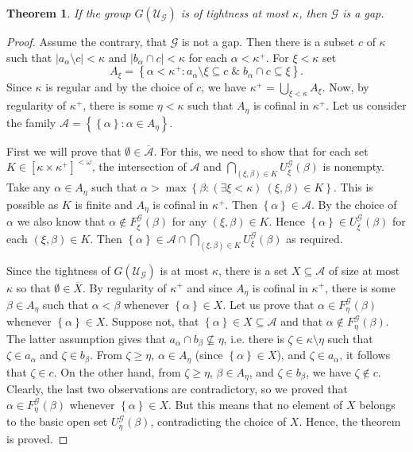 \documentclass{amsart}
\theoremstyle{plain}
\newtheorem{theorem}{Theorem}[section]
\theoremstyle{definition}
\numberwithin{equation}{section}
\renewcommand{\a}{\alpha}
\renewcommand{\b}{\beta}
\renewcommand{\k}{\kappa}
\renewcommand{\o}{\omega}
\newcommand{\ps}{\emptyset}
\newcommand{\sst}{\subseteq}
\newcommand{\cu}{\mathcal U}
\newcommand{\set}[1]{\left\{#1\right\}}
\newcommand{\abs}[1]{\left\vert#1\right\vert}
\begin{document}
\begin{theorem}\label{t:gap-frechet}
	If the group $G(\cu_\mathcal{G})$ is of tightness at most $\k$, then $\mathcal{G}$ is a gap.
\end{theorem}

\begin{proof}
	Assume the contrary, that $\mathcal{G}$ is not a gap.
	Then there is a subset $c$ of $\k$ such that $\abs{a_{\a}\setminus c}<\k$ and $\abs{b_{\a} \cap c}<\k$ for each $\a < \k^+$.
	For $\xi<\k$ set
	$$
	A_{\xi} = \set{\a < \k^+: a_{\a}\setminus \xi \sst c \;\&\; b_{\a} \cap c \sst \xi}.
	$$
	Since $\k$ is regular and by the choice of $c$, we have $\k^+ = \bigcup_{\xi < \k}A_{\xi}$.
	Now, by regularity of $\k^+$, there is some $\eta < \k$ such that $A_{\eta}$ is cofinal in $\k^+$.
	Let us consider the family $\mathcal{A} = \set{ \set{\a}: \a \in A_{\eta} }$.
	
	First we will prove that $\ps \in \overline{\mathcal{A}}$.
	For this, we need to show that for each set $K\in \left[\k\times\k^+\right]^{<\o}$, the intersection of $\mathcal A$ and $\bigcap_{(\xi,\b)\in K}U^{\mathcal G}_{\xi}(\b)$ is nonempty.
	Take any $\a\in A_{\eta}$ such that $\a>\max\set{\b:(\exists \xi<\k)\ (\xi,\b)\in K}$.
	This is possible as $K$ is finite and $A_{\eta}$ is cofinal in $\k^+$.
	Then $\set{\a}\in \mathcal A$.
	By the choice of $\a$ we also know that $\a\notin F^{\mathcal G}_{\xi}(\b)$ for any $(\xi,\b)\in K$.
	Hence $\set{\a}\in U^{\mathcal G}_{\xi}(\b)$ for each $(\xi,\b)\in K$.
	Then $\set{\a}\in \mathcal A\cap \bigcap_{(\xi,\b)\in K}U^{\mathcal G}_{\xi}(\b)$ as required.
		
	Since the tightness of $G(\cu_\mathcal{G})$ is at most $\k$, there is a set $X\sst\mathcal{A}$ of size at most $\k$ so that $\ps\in\overline{X}$.
	By regularity of $\k^+$ and since $A_{\eta}$ is cofinal in $\k^+$, there is some $\b\in A_{\eta}$ such that $\a<\b$ whenever $\set{\a}\in X$.
	Let us prove that $\a\in F^{\mathcal G}_{\eta}(\b)$ whenever $\set{\a}\in X$.
	Suppose not, that $\set{\a}\in X\sst\mathcal A$ and that $\a\notin F^{\mathcal G}_{\eta}(\b)$.
	The latter assumption gives that $a_{\a}\cap b_{\b}\not\sst \eta$, i.e. there is $\zeta\in\k\setminus \eta$ such that $\zeta\in a_{\a}$ and $\zeta\in b_{\b}$.
	From $\zeta\ge\eta$, $\a\in A_{\eta}$ (since $\set{\a}\in X$), and $\zeta\in a_{\a}$, it follows that $\zeta\in c$.
	On the other hand, from $\zeta\ge\eta$, $\b\in A_{\eta}$, and $\zeta\in b_{\b}$, we have $\zeta\notin c$.
	Clearly, the last two observations are contradictory, so we proved that $\a\in F^{\mathcal G}_{\eta}(\b)$ whenever $\set{\a}\in X$.
	But this means that no element of $X$ belongs to the basic open set $U^{\mathcal G}_{\eta}(\b)$, contradicting the choice of $X$.
	Hence, the theorem is proved.
\end{proof}
\end{document}
